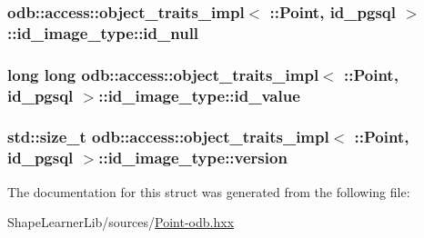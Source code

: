 \subsubsection[{id\+\_\+null}]{ odb\+::access\+::object\+\_\+traits\+\_\+impl$<$ \+::{\bf Point}, id\+\_\+pgsql $>$\+::id\+\_\+image\+\_\+type\+::id\+\_\+null}\label{structodb_1_1access_1_1object__traits__impl_3_01_1_1_point_00_01id__pgsql_01_4_1_1id__image__type_ad48b176797409045235d07e7bd8c99ab}
\hypertarget{structodb_1_1access_1_1object__traits__impl_3_01_1_1_point_00_01id__pgsql_01_4_1_1id__image__type_ab181a61520f0248513bad6f7d7aa8d00}{}
\subsubsection[{id\+\_\+value}]{\setlength{\rightskip}{0pt plus 5cm}long long odb\+::access\+::object\+\_\+traits\+\_\+impl$<$ \+::{\bf Point}, id\+\_\+pgsql $>$\+::id\+\_\+image\+\_\+type\+::id\+\_\+value}\label{structodb_1_1access_1_1object__traits__impl_3_01_1_1_point_00_01id__pgsql_01_4_1_1id__image__type_ab181a61520f0248513bad6f7d7aa8d00}
\hypertarget{structodb_1_1access_1_1object__traits__impl_3_01_1_1_point_00_01id__pgsql_01_4_1_1id__image__type_a0e4ab5e57a2ef1099ba4df51ceab6f14}{}
\subsubsection[{version}]{\setlength{\rightskip}{0pt plus 5cm}std\+::size\+\_\+t odb\+::access\+::object\+\_\+traits\+\_\+impl$<$ \+::{\bf Point}, id\+\_\+pgsql $>$\+::id\+\_\+image\+\_\+type\+::version}\label{structodb_1_1access_1_1object__traits__impl_3_01_1_1_point_00_01id__pgsql_01_4_1_1id__image__type_a0e4ab5e57a2ef1099ba4df51ceab6f14}


The documentation for this struct was generated from the following file\+:\begin{DoxyCompactItemize}
\item 
Shape\+Learner\+Lib/sources/\hyperlink{_point-odb_8hxx}{Point-\/odb.\+hxx}\end{DoxyCompactItemize}
